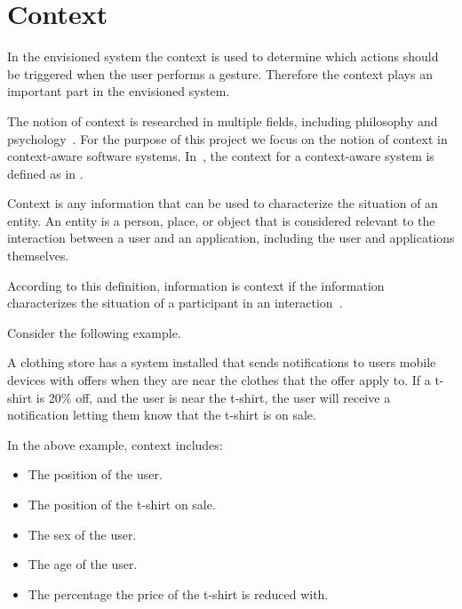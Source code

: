 \section{Context}
\label{sec:analysis:context}

In the envisioned system the context is used to determine which actions should be triggered when the user performs a gesture. Therefore the context plays an important part in the envisioned system.

The notion of context is researched in multiple fields, including philosophy and psychology~\cite{bolchini2007data}. For the purpose of this project we focus on the notion of context in context-aware software systems. In~\cite{abowd1999towards}, the context for a context-aware system is defined as in .

\begin{definition}
\label{def:context}
Context is any information that can be used to characterize the situation of an entity. An entity is a person, place, or object that is considered relevant to the interaction between a user and an application, including the user and applications themselves.
\end{definition}

According to this definition, information is context if the information characterizes the situation of a participant in an interaction~\cite{abowd1999towards}.

Consider the following example.

\begin{testexample}
A clothing store has a system installed that sends notifications to users mobile devices with offers when they are near the clothes that the offer apply to. If a t-shirt is 20\% off, and the user is near the t-shirt, the user will receive a notification letting them know that the t-shirt is on sale.
\end{testexample}

In the above example, context includes:

\begin{itemize}
\item The position of the user.
\item The position of the t-shirt on sale.
\item The sex of the user.
\item The age of the user.
\item The percentage the price of the t-shirt is reduced with.
\end{itemize}

